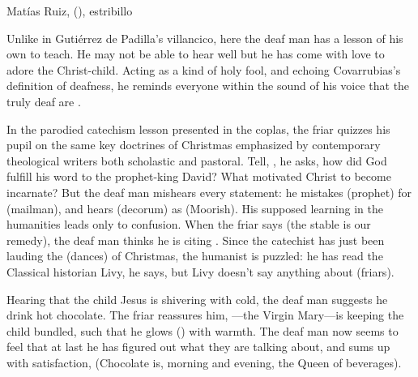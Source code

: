 
\begin{musicexample}
    \caption{Matías Ruiz,  (), estribillo} 
    \label{mus:Ruiz-Sordos-dialogue}
\end{musicexample}

Unlike in Gutiérrez de Padilla's villancico, here the deaf man has a lesson of
his own to teach.
He may not be able to hear well but he has come with love to adore the
Christ-child.
Acting as a kind of holy fool, and echoing Covarrubias's definition of deafness,
he reminds everyone within the sound of his voice that the truly deaf are
.

In the parodied catechism lesson presented in the coplas, the friar quizzes his
pupil on the same key doctrines of Christmas emphasized by contemporary
theological writers both scholastic and pastoral.%
    \Autocite[179--203]{Cashner:PhD}
Tell, , he asks, how did God fulfill his word to the
prophet-king David?  
What motivated Christ to become incarnate? 
But the deaf man mishears every statement: he mistakes 
(prophet) for  (mailman), and hears 
(decorum) as  (Moorish).
His supposed learning in the humanities leads only to confusion.
When the friar says  (the stable is our
remedy), the deaf man thinks he is citing .
Since the catechist has just been lauding the  (dances) of
Christmas, the humanist is puzzled: he has read the Classical historian Livy, he
says, but Livy doesn't say anything about  (friars).

Hearing that the child Jesus is shivering with cold, the deaf man suggests he
drink hot chocolate.
The friar reassures him, ---the Virgin Mary---is keeping the
child bundled, such that he glows () with warmth.
The deaf man now seems to feel that at last he has figured out what they are
talking about, and sums up with satisfaction,  (Chocolate is, morning and evening, the Queen of
beverages).


